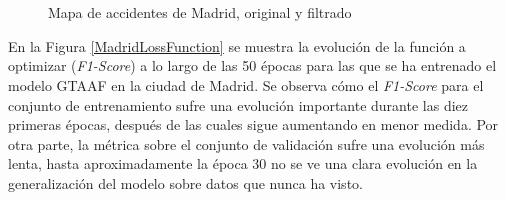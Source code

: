 \begin{figure}[H]
	\centering
	\\
	\\
	\caption{Mapa de accidentes de Madrid, original y filtrado}
	\label{MadridAccidentsMap}
\end{figure}

En la Figura \ref{MadridLossFunction} se muestra la evolución de la función a optimizar (\textit{F1-Score}) a lo largo de las 50 épocas para las que se ha entrenado el modelo GTAAF en la ciudad de Madrid. Se observa cómo el \textit{F1-Score} para el conjunto de entrenamiento sufre una evolución importante durante las diez primeras épocas, después de las cuales sigue aumentando en menor medida. Por otra parte, la métrica sobre el conjunto de validación sufre una evolución más lenta, hasta aproximadamente la época 30 no se ve una clara evolución en la generalización del modelo sobre datos que nunca ha visto.


